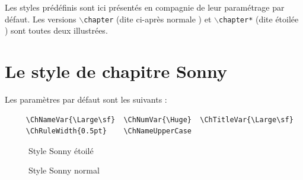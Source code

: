 \documentclass{report}
\newcommand{\A}[1]{{$\backslash${\tt #1}}}
\begin{document}
    Les styles prédéfinis sont ici présentés en compagnie de leur paramétrage 
    par défaut. Les versions \A{chapter} (dite ci-après \og normale \fg{}) et
    \A{chapter*} (dite \og étoilée \fg{}) sont toutes deux illustrées.

    \section{Le style de chapitre Sonny}
    Les paramètres par défaut sont les suivants :
    {\small\begin{verbatim}  
     \ChNameVar{\Large\sf}  \ChNumVar{\Huge}  \ChTitleVar{\Large\sf}
     \ChRuleWidth{0.5pt}    \ChNameUpperCase
    \end{verbatim}}    
    \begin{figure}[h]
      \begin{minipage}{7 cm}
        \label{fig:Sonnys}
        \centerline{\color{gray!25}} 
        \caption{Style Sonny \og étoilé \fg{}}
      \end{minipage}\hfill
      \begin{minipage}{7 cm}
        \label{fig:Sonny}
        \centerline{\color{gray!25}}
        \caption{Style Sonny  \og normal \fg{}}
      \end{minipage}\hfill
    \end{figure}    
    
\end{document}
